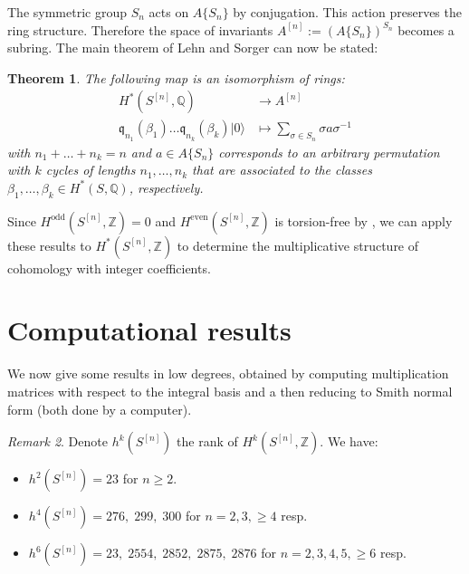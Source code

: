 \documentclass{amsart}
\newcommand{\hilb}[1]{^{[#1]}}
\newcommand{\vac}{|0\rangle}
\newcommand{\IQ}{\mathbb{Q}}
\newcommand{\IZ}{\mathbb{Z}}
\newcommand{\kq}{\mathfrak{q}}
\theoremstyle{plain}
\newtheorem{theorem}{Theorem}[section]
\theoremstyle{definition}
\theoremstyle{remark}
\newtheorem{remark}[theorem]{Remark}
\begin{document}
The symmetric group $S_n$ acts on $A\{S_n\}$ by conjugation. This action preserves the ring structure. Therefore the space of invariants $A\hilb{n} := \left(A\{S_n\} \right)^{S_n}$ becomes a subring. The main theorem of Lehn and Sorger can now be stated:
\begin{theorem} \cite[Thm. 3.2.]{LehnSorger}
The following map is an isomorphism of rings:
\begin{align*}
H^\ast(S\hilb{n},\IQ) & \longrightarrow A\hilb{n} \\
\kq_{n_1}(\beta_1)\ldots \kq_{n_k}(\beta_k) \vac &\longmapsto \sum_{\sigma\in S_n} \sigma a \sigma^{{-}1} 
\end{align*}
with $n_1+\ldots + n_k =n$ and $a\in A\{S_n\} $ corresponds to an arbitrary permutation with $k$ cycles of lengths $n_1,\ldots,n_k$ that are associated to the classes $\beta_1,\ldots,\beta_k \in H^\ast(S,\IQ)$, respectively.
\end{theorem}

Since $H^\text{odd}(S\hilb{n},\IZ) = 0$ and $H^\text{even}(S\hilb{n},\IZ)$ is torsion-free by \cite{Markman}, we can apply these results to $H^\ast(S\hilb{n}, \IZ)$ to determine the multiplicative structure of cohomology with integer coefficients.

\section{Computational results} 
We now give some results in low degrees, obtained by computing multiplication matrices with respect to the integral basis and a then reducing to Smith normal form (both done by a computer).
\begin{remark}
Denote $h^k(S\hilb{n})$ the rank of $H^k(S\hilb{n},\IZ)$. We have:
\begin{itemize}
\item $h^2(S\hilb{n}) = 23 $ for $n\geq 2$.
\item $h^4(S\hilb{n}) = 276,\; 299,\; 300$ for $n=2,3, \geq 4$ resp.
\item $h^6(S\hilb{n}) = 23,\; 2554,\; 2852,\; 2875,\; 2876$ for $n=2,3,4,5,\geq6$ resp.
\end{itemize}
\end{remark}
\end{document}
